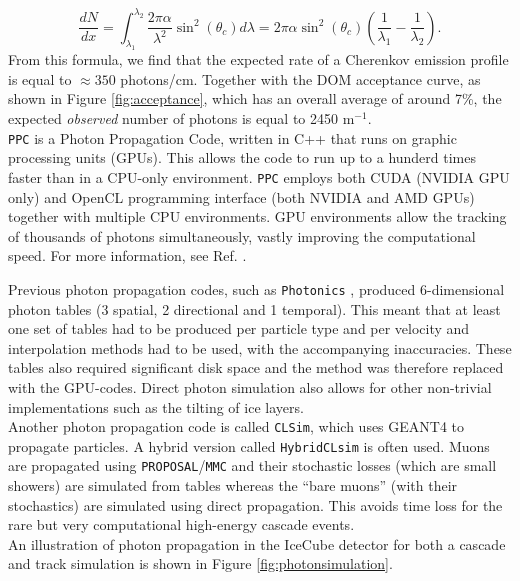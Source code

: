 \begin{equation}
\frac{dN}{dx} = \int_{\lambda_1}^{\lambda_2} \frac{2 \pi \alpha}{\lambda^2} \sin^2 \left(\theta_c\right) d\lambda = 2\pi \alpha \sin^2 \left(\theta_c\right) \left(\frac{1}{\lambda_1} -\frac{1}{\lambda_2}\right).
\end{equation}
From this formula, we find that the expected rate of a Cherenkov emission profile is equal to $\approx 350$ photons/cm. Together with the DOM acceptance curve, as shown in Figure \ref{fig:acceptance}, which has an overall average of around 7\%, the expected \textit{observed} number of photons is equal to 2450 m$^{-1}$.\\

\noindent \texttt{PPC} is a Photon Propagation Code, written in C++ that runs on graphic processing units (GPUs). This allows the code to run up to a hunderd times faster than in a CPU-only environment. \texttt{PPC} employs both CUDA (NVIDIA GPU only) and OpenCL programming interface (both NVIDIA and AMD GPUs) together with multiple CPU environments.
GPU environments allow the tracking of thousands of photons simultaneously, vastly improving the computational speed. For more information, see Ref. \cite{dimaspice}.

Previous photon propagation codes, such as \texttt{Photonics}  \cite{Lundberg:2007mf}, produced 6-dimensional photon tables (3 spatial, 2 directional and 1 temporal). This meant that at least one set of tables had to be produced per particle type and per velocity and interpolation methods had to be used, with the accompanying inaccuracies. These tables also required significant disk space and the method was therefore replaced with the GPU-codes. Direct photon simulation also allows for other non-trivial implementations such as the tilting of ice layers.\\

\noindent Another photon propagation code is called \texttt{CLSim}, which uses GEANT4 to propagate particles. A hybrid version called \texttt{HybridCLsim} is often used. Muons are propagated using \texttt{PROPOSAL}/\texttt{MMC}  and their stochastic losses (which are small showers) are simulated from tables whereas the ``bare muons'' (with their stochastics) are simulated using direct propagation. This avoids time loss for the rare but very computational high-energy cascade events.\\

\noindent An illustration of photon propagation in the IceCube detector for both a cascade and track simulation is shown in Figure \ref{fig:photonsimulation}.

